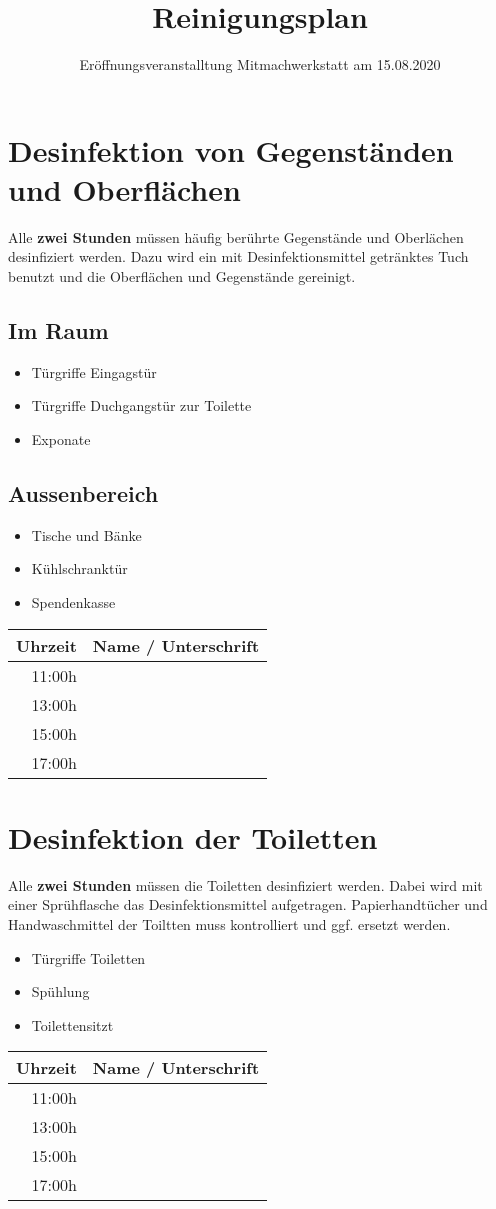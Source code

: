 \documentclass[10pt,a4paper]{scrartcl}
\title{Reinigungsplan}
\subtitle{Eröffnungsveranstalltung Mitmachwerkstatt am 15.08.2020}
\date{\vspace{-8ex}}
\begin{document}
\maketitle

\renewcommand{\arraystretch}{2.0}

\section{Desinfektion von Gegenständen und Oberflächen}
Alle \textbf{zwei Stunden} müssen häufig berührte Gegenstände und Oberlächen desinfiziert werden. Dazu wird ein mit 
Desinfektionsmittel getränktes Tuch benutzt und die Oberflächen und Gegenstände gereinigt.

\subsection{Im Raum}
\begin{itemize}
\item Türgriffe Eingagstür
\item Türgriffe Duchgangstür zur Toilette
\item Exponate
\end{itemize}

\subsection{Aussenbereich}
\begin{itemize}
\item Tische und Bänke
\item Kühlschranktür
\item Spendenkasse
\end{itemize}

\begin{tabular}{ | r | p{15cm} |}
\hline
\textbf{Uhrzeit} & \textbf{Name / Unterschrift} \\ \hline
11:00h & \\ \hline
13:00h & \\ \hline
15:00h & \\ \hline
17:00h & \\ \hline
\end{tabular}

\vspace{4ex}

\section{Desinfektion der Toiletten}
Alle \textbf{zwei Stunden} müssen die Toiletten desinfiziert werden. Dabei wird mit einer Sprühflasche das Desinfektionsmittel 
aufgetragen.
Papierhandtücher und Handwaschmittel der Toiltten muss kontrolliert und ggf. ersetzt werden.
\begin{itemize}
\item Türgriffe Toiletten
\item Spühlung
\item Toilettensitzt
\end{itemize}

\begin{tabular}{ | r | p{15cm} |}
\hline
\textbf{Uhrzeit} & \textbf{Name / Unterschrift} \\ \hline
11:00h & \\ \hline
13:00h & \\ \hline
15:00h & \\ \hline
17:00h & \\ \hline
\end{tabular}
\end{document}
